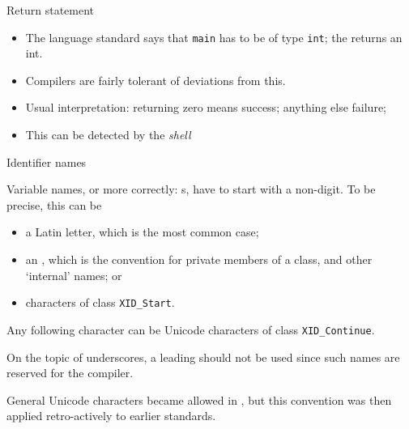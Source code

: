 \begin{slide}{Return statement}
  \label{sl:main-int}
  \begin{itemize}
  \item The language standard says that \lstinline{main} has to be of type
    \lstinline{int}; the  returns an int.
  \item Compilers are fairly tolerant of deviations from this.
  \item Usual interpretation: returning zero means success; anything else failure;
  \item This  can be detected by the
    \emph{shell}
  \end{itemize}
\end{slide}

 {Identifier names}
\label{sec:unicode}

Variable names, or more correctly: s,
have to start with a non-digit. To be precise, this can be
\begin{itemize}
\item
  a Latin letter, which is the most common case;
\item an , which is the convention for private members of a class, and other `internal' names; or 
\item {} characters of class \texttt{XID\_Start}.
\end{itemize}
Any following character can be Unicode characters of class \texttt{XID\_Continue}.

On the topic of underscores, a leading  should not be used
since such names are reserved for the compiler.

\begin{remark}
  General Unicode characters became allowed in , but
  this convention was then applied retro-actively to earlier standards.
\end{remark}

